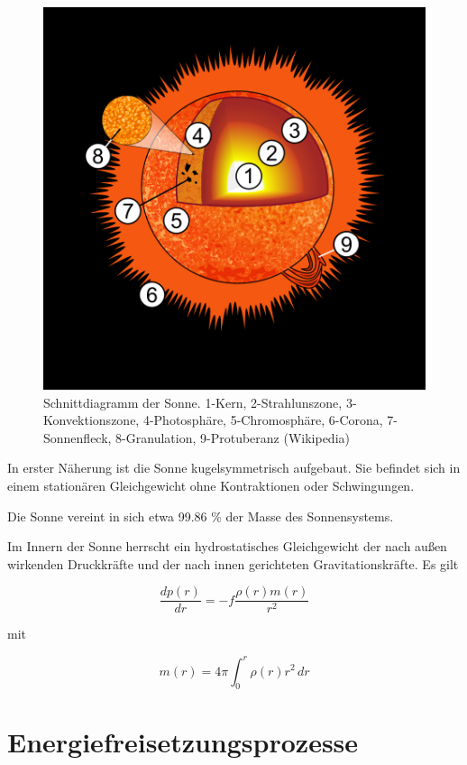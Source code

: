 \documentclass[
  a4paper,
  DIV=11]{scrreprt}
\begin{document}
\begin{figure}

{\centering \includegraphics{./images/paste-2464B050.png}

}

\caption{\label{fig-schnitt-sonne}Schnittdiagramm der Sonne. 1-Kern,
2-Strahlunszone, 3-Konvektionszone, 4-Photosphäre, 5-Chromosphäre,
6-Corona, 7-Sonnenfleck, 8-Granulation, 9-Protuberanz (Wikipedia)}

\end{figure}

In erster Näherung ist die Sonne kugelsymmetrisch aufgebaut. Sie
befindet sich in einem stationären Gleichgewicht ohne Kontraktionen oder
Schwingungen.

Die Sonne vereint in sich etwa 99.86 \% der Masse des Sonnensystems.

Im Innern der Sonne herrscht ein hydrostatisches Gleichgewicht der nach
außen wirkenden Druckkräfte und der nach innen gerichteten
Gravitationskräfte. Es gilt

\[
\frac{d p(r)}{d r} = - f \frac{\rho(r) m(r)}{r^2}
\]

mit

\[
m(r) = 4 \pi \int_0 ^r \rho(r) r^2 \, dr
\]

\hypertarget{energiefreisetzungsprozesse}{%
\section{Energiefreisetzungsprozesse}\label{energiefreisetzungsprozesse}}
\end{document}
